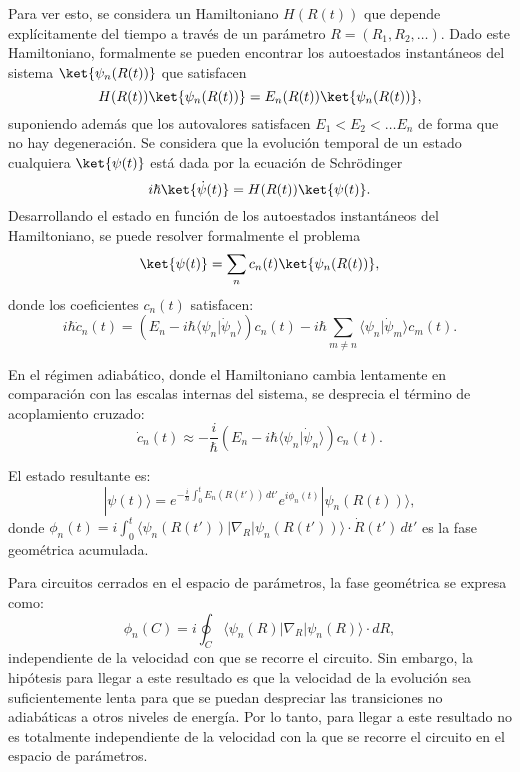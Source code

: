 Para ver esto, se considera un Hamiltoniano $H(R(t))$ que depende explícitamente del tiempo a través de un parámetro $R=(R_1,R_2,\dots)$. Dado este Hamiltoniano, formalmente se pueden encontrar los autoestados instantáneos del sistema $\ket{\psi_n(R(t))}$ que satisfacen
\begin{equation}
    H(R(t))\ket{\psi_n(R(t))}=E_n(R(t))\ket{\psi_n(R(t))},
\end{equation}
suponiendo además que los autovalores satisfacen $E_1<E_2<\dots E_n$ de forma que no hay degeneraci\'on. Se considera que la evoluci\'on temporal de un estado cualquiera $\ket{\psi(t)}$ está dada por la ecuación de Schr\"odinger
\begin{equation}
    i \hbar \ket{\dot \psi(t)}=H(R(t))\ket{\psi(t)}.
\end{equation}
Desarrollando el estado en funci\'on de los autoestados instantáneos del Hamiltoniano, se puede resolver formalmente el problema
\begin{equation}
    \ket{\psi(t)} = \sum_n c_n(t)\ket{\psi_n(R(t))},
\end{equation}
donde los coeficientes \( c_n(t) \) satisfacen:
\[
i \hbar \dot{c}_n(t) = \left( E_n - i \hbar \langle \psi_n | \dot{\psi}_n \rangle \right) c_n(t) - i \hbar \sum_{m \neq n} \langle \psi_n | \dot{\psi}_m \rangle c_m(t).
\]

En el régimen adiabático, donde el Hamiltoniano cambia lentamente en comparación con las escalas internas del sistema, se desprecia el término de acoplamiento cruzado:
\[
\dot{c}_n(t) \approx -\frac{i}{\hbar} \left( E_n - i \hbar \langle \psi_n | \dot{\psi}_n \rangle \right) c_n(t).
\]

El estado resultante es:
\[
| \psi(t) \rangle = e^{-\frac{i}{\hbar} \int_0^t E_n(R(t')) \, dt'} e^{i \phi_n(t)} | \psi_n(R(t)) \rangle,
\]
donde \( \phi_n(t) = i \int_0^t \langle \psi_n(R(t')) | \nabla_R | \psi_n(R(t')) \rangle \cdot \dot{R}(t') \, dt' \) es la fase geométrica acumulada.

Para circuitos cerrados en el espacio de parámetros, la fase geométrica se expresa como:
\begin{equation}\label{ec2:fg berry}
    \phi_n(C) = i \oint_C \langle \psi_n(R) | \nabla_R | \psi_n(R) \rangle \cdot dR,    
\end{equation}
independiente de la velocidad con que se recorre el circuito. Sin embargo, la hipótesis para llegar a este resultado es que la velocidad de la evoluci\'on sea suficientemente lenta para que se puedan despreciar las transiciones no adiab\'aticas a otros niveles de energ\'ia. Por lo tanto, para llegar a este resultado no es totalmente independiente de la velocidad con la que se recorre el circuito en el espacio de parámetros.

